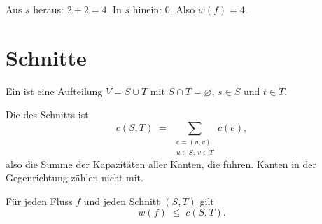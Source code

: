 \begin{merksatz}
Aus $s$ heraus: $2 + 2 = 4$. In $s$ hinein: $0$. Also $w(f) = 4$.

\begin{center}
\begin{minipage}{0.88\textwidth}
\end{minipage}
\end{center}
\end{merksatz}

\section{Schnitte}

\begin{definition}
Ein  ist eine Aufteilung $V = S \cup T$ mit $S \cap T = \varnothing$, $s \in S$ und $t \in T$.

Die  des Schnitts ist
\[ c(S,T) \;=\; \sum_{\substack{e = (u,v) \\ u \in S,\ v \in T}} c(e) , \]
also die Summe der Kapazitäten aller Kanten, die  führen. Kanten in der Gegenrichtung zählen nicht mit.
\end{definition}

\begin{merksatz}
Für jeden Fluss $f$ und jeden Schnitt $(S,T)$ gilt
\[ w(f) \;\le\; c(S,T) . \]
\end{merksatz}

